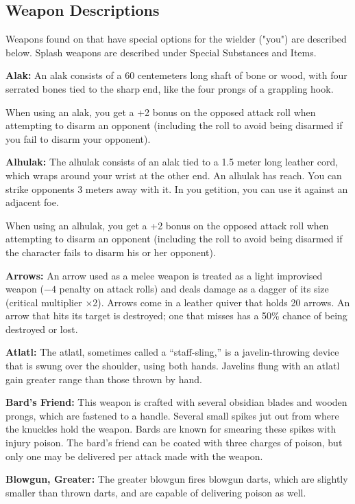 \subsection{Weapon Descriptions}
Weapons found on  that have special options for the wielder ("you") are described below. Splash weapons are described under Special Substances and Items.

\textbf{Alak:} An alak consists of a 60 centemeters long shaft of bone or wood, with four serrated bones tied to the sharp end, like the four prongs of a grappling hook.

When using an alak, you get a +2 bonus on the opposed attack roll when attempting to disarm an opponent (including the roll to avoid being disarmed if you fail to disarm your opponent). 

\textbf{Alhulak:} The alhulak consists of an alak tied to a 1.5 meter long leather cord, which wraps around your wrist at the other end. An alhulak has reach. You can strike opponents 3 meters away with it. In you getition, you can use it against an adjacent foe.

When using an alhulak, you get a +2 bonus on the opposed attack roll when attempting to disarm an opponent (including the roll to avoid being disarmed if the character fails to disarm his or her opponent). 

\textbf{Arrows:} An arrow used as a melee weapon is treated as a light improvised weapon ($-4$ penalty on attack rolls) and deals damage as a dagger of its size (critical multiplier $\times$2). Arrows come in a leather quiver that holds 20 arrows. An arrow that hits its target is destroyed; one that misses has a 50\% chance of being destroyed or lost. 

\textbf{Atlatl:} The atlatl, sometimes called a ``staff-sling,'' is a javelin-throwing device that is swung over the shoulder, using both hands. Javelins flung with an atlatl gain greater range than those thrown by hand. 

\textbf{Bard's Friend:} This weapon is crafted with several obsidian blades and wooden prongs, which are fastened to a handle. Several small spikes jut out from where the knuckles hold the weapon. Bards are known for smearing these spikes with injury poison. The bard's friend can be coated with three charges of poison, but only one may be delivered per attack made with the weapon. 

\textbf{Blowgun, Greater:} The greater blowgun fires blowgun darts, which are slightly smaller than thrown darts, and are capable of delivering poison as well. 

